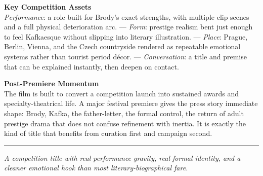 \documentclass[11pt,letterpaper]{article}
\begin{document}
\vspace{2pt}

\textbf{Key Competition Assets}\\
\textit{Performance}: a role built for Brody's exact strengths, with multiple clip scenes and a full physical deterioration arc. --- \textit{Form}: prestige realism bent just enough to feel Kafkaesque without slipping into literary illustration. --- \textit{Place}: Prague, Berlin, Vienna, and the Czech countryside rendered as repeatable emotional systems rather than tourist period décor. --- \textit{Conversation}: a title and premise that can be explained instantly, then deepen on contact.

\vspace{2pt}

\textbf{Post-Premiere Momentum}\\
The film is built to convert a competition launch into sustained awards and specialty-theatrical life. A major festival premiere gives the press story immediate shape: Brody, Kafka, the father-letter, the formal control, the return of adult prestige drama that does not confuse refinement with inertia. It is exactly the kind of title that benefits from curation first and campaign second.

\vspace{4pt}
\textcolor{sectionrule}{\rule{\textwidth}{0.5pt}}
\vspace{2pt}
\begin{center}
{\small\color{kafkalight}\textit{A competition title with real performance gravity, real formal identity, and a cleaner emotional hook than most literary-biographical fare.}}
\end{center}
\end{document}
